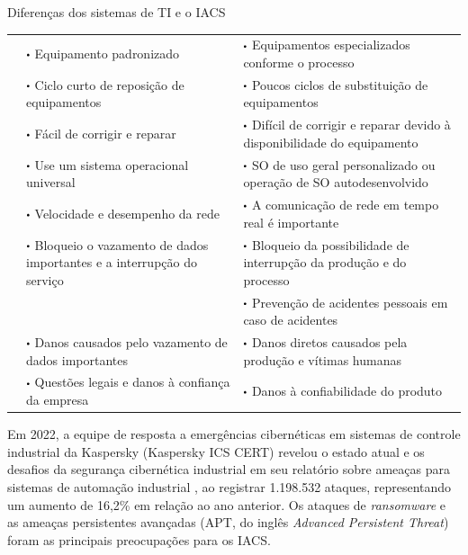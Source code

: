     \begin{quadro}[htbp]
        \caption{\label{qdr:it-iacs}Diferenças dos sistemas de TI e o IACS}
        \begin{tabular}{|M{3.25cm}|p{5.50cm}|p{5.50cm}|}
            \hline
             &  &  \\
            \hline
             & $\sbullet$ Equipamento padronizado & $\sbullet$ Equipamentos especializados conforme o processo \\
            & $\sbullet$ Ciclo curto de reposição de equipamentos & $\sbullet$ Poucos ciclos de substituição de equipamentos \\
            & $\sbullet$ Fácil de corrigir e reparar & $\sbullet$ Difícil de corrigir e reparar devido à disponibilidade do equipamento \\
            & $\sbullet$ Use um sistema operacional universal & $\sbullet$ SO de uso geral personalizado ou operação de SO autodesenvolvido\\
            & $\sbullet$ Velocidade e desempenho da rede & $\sbullet$ A comunicação de rede em tempo real é importante\\
            \hline
             & $\sbullet$ Bloqueio o vazamento de dados importantes e a interrupção do serviço & $\sbullet$ Bloqueio da possibilidade de interrupção da produção e do processo \\
            & & $\sbullet$ Prevenção de acidentes pessoais em caso de acidentes \\
            \hline
             & $\sbullet$ Danos causados pelo vazamento de dados importantes & $\sbullet$ Danos diretos causados pela produção e vítimas humanas \\
            & $\sbullet$ Questões legais e danos à confiança da empresa & $\sbullet$ Danos à confiabilidade do produto \\
            \hline
	\end{tabular}
	\begin{flushleft}
	\end{flushleft}
    \end{quadro}

    Em 2022, a equipe de resposta a emergências cibernéticas em sistemas de controle industrial da Kaspersky (Kaspersky ICS CERT) revelou o estado atual e os desafios da segurança cibernética industrial em seu relatório sobre ameaças para sistemas de automação industrial \cite{kaspersky2023}, ao registrar 1.198.532 ataques, representando um aumento de 16,2\% em relação ao ano anterior. Os ataques de \textit{ransomware} e as ameaças persistentes avançadas (APT, do inglês \textit{Advanced Persistent Threat}) foram as principais preocupações para os IACS.

